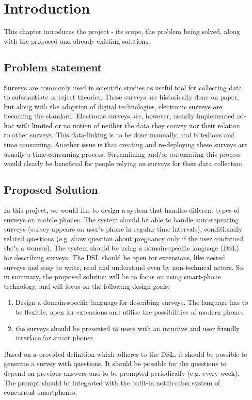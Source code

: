\chapter{Introduction}
\label{chap:introduction}
This chapter introduces the project - its scope, the problem being solved, along with the proposed and already existing solutions.

\section{Problem statement}
\label{sec:problemstatement}
Surveys are commonly used in scientific studies as useful tool for collecting data to substantiate or reject theories. These surveys are historically done on paper, but along with the adoption of digital technologies, electronic surveys are becoming the standard.
Electronic surveys are, however, usually implemented ad-hoc with limited or no notion of neither the data they convey nor their relation to other surveys. This data-linking is to be done manually, and is tedious and time consuming. Another issue is that creating and re-deploying these surveys are usually a time-consuming process.
Streamlining and/or automating this process would clearly be beneficial for people relying on surveys for their data collection.

\section{Proposed Solution}
\label{sec:proposedsolution}
In this project, we would like to design a system that handles different types of surveys on mobile phones. The system should be able to handle auto-repeating surveys (survey appears on user"s phone in regular time intervals), conditionally related questions (e.g. show question about pregnancy only if the user confirmed she"s a women).
The system should be using a domain-specific language (DSL) for describing surveys. The DSL should be open for extensions, like nested surveys and easy to write, read and understand even by non-technical actors.
So, in summary, the proposed solution will be to focus on using smart-phone technology, and will focus on the following design goals:
\begin{enumerate}
  \item Design a domain-specific language for describing surveys. The language has to be flexible, open for extensions and utilise the possibilities of modern phones
  \item the surveys should be presented to users with an intuitive and user friendly interface for smart phones.
\end{enumerate}
Based on a provided definition which adheres to the DSL, it should be possible to generate a survey with questions. It should be possible for the questions to depend on previous answers and to be prompted periodically (e.g. every week). The prompt should be integrated with the built-in notification system of concurrent smartphones.

